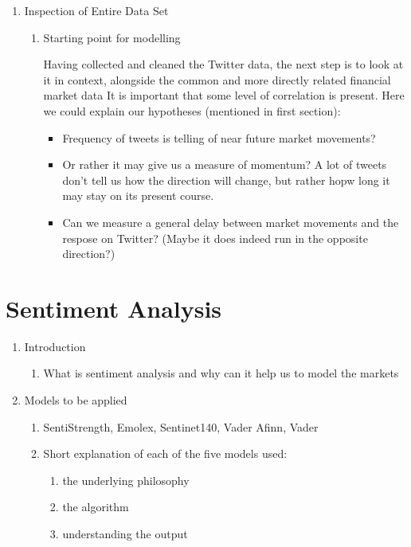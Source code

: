 \documentclass{article}
\begin{document}
\begin{enumerate}
\item Inspection of Entire Data Set
\label{sec-2-5}

\begin{enumerate}
\item Starting point for modelling
\label{sec-2-5-1}

Having collected and cleaned the Twitter data, the next step is to look at it in context, alongside the common and more directly related financial market data
It is important that some level of correlation is present.
Here we could explain our hypotheses (mentioned in first section):
\begin{itemize}
\item Frequency of tweets is telling of near future market movements?
\item Or rather it may give us a measure of momentum? A lot of tweets don't tell us how the direction will change, but rather hopw long it may stay on its present course.
\item Can we measure a general delay between market movements and the respose on Twitter? (Maybe it does indeed run in the opposite direction?)
\end{itemize}
\end{enumerate}
\end{enumerate}


\section{Sentiment Analysis}
\label{sec-3}

\begin{enumerate}
\item Introduction
\label{sec-3-1}

\begin{enumerate}
\item What is sentiment analysis and why can it help us to model the markets
\label{sec-3-1-1}
\end{enumerate}

\item Models to be applied
\label{sec-3-2}

\begin{enumerate}
\item SentiStrength, Emolex, Sentinet140, Vader Afinn, Vader
\label{sec-3-2-1}

\item Short explanation of each of the five models used:
\label{sec-3-2-2}

\begin{enumerate}
\item the underlying philosophy
\label{sec-3-2-2-1}

\item the algorithm
\label{sec-3-2-2-2}

\item understanding the output
\label{sec-3-2-2-3}
\end{enumerate}
\end{enumerate}
\end{enumerate}
\end{document}

